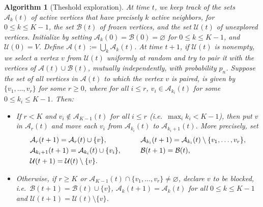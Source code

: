 \documentclass[11pt,a4paper, reqno]{article}
\newtheorem{algo}{Algorithm}
\begin{document}
\begin{algo}[{Theshold exploration}]\label{algo-th}
\normalfont At time $t$, we keep track of the sets $\mathcal{A}_k(t)$ of active vertices that have precisely $k$ active neighbors, for $0\leq k\leq K-1$, the set $\mathcal{B}(t)$ of frozen vertices, and the set $\mathcal{U}(t)$ of unexplored vertices.
Initialize by setting $\mathcal{A}_k(0)=\mathcal{B}(0)=\varnothing$ for $0\leq k\leq K-1$, and $\mathcal{U}(0)=V$. Define $\mathcal{A}(t):=\bigcup_{k}\mathcal{A}_k(t)$.
At time $t+1$, if $\mathcal{U}(t)$ is nonempty, we select a vertex $v$ from $\mathcal{U}(t)$ uniformly at random and try to pair it with the vertices of $\mathcal{A}(t)\cup\mathcal{B}(t)$, mutually independently, with probability $p_n$.
Suppose the set of all vertices in $\mathcal{A}(t)$ to which the vertex $v$ is paired, is given by $\{v_1,\dots,v_r\}$ for some $r\geq 0$, where for all $i\leq r$, $v_i\in \mathcal{A}_{k_i}(t)$ for some $0\leq k_i\leq K-1$. Then:
\begin{itemize}
\item If $r<K$ and $v_i\notin \mathcal{A}_{K-1}(t)$ for all $i\leq r$ (i.e.~$\max_i k_i<K-1$), then put $v$ in $\mathcal{A}_r(t)$ and move each $v_i$ from $\mathcal{A}_{k_i}(t)$ to $\mathcal{A}_{k_i+1}(t)$.
More precisely, set
\begin{equation*}
\begin{aligned}[t]
& \mathcal{A}_r(t+1)=\mathcal{A}_r(t)\cup \{v\},\\
& \mathcal{A}_{k_i+1}(t+1)= \mathcal{A}_{k_i}(t)\cup \{v_i\},\\
& \mathcal{U}(t+1)=\mathcal{U}(t)\setminus \{v\}.
  \end{aligned}
  \hspace*{1cm}
  \begin{aligned}[t]
&  \mathcal{A}_{k_i}(t+1)=\mathcal{A}_{k_i}(t)\setminus \{v_1,\dots,v_r\},\\
&  \mathcal{B}(t+1)=\mathcal{B}(t),\\
  \end{aligned}
\end{equation*}

\item Otherwise, if $r\geq K$ or $\mathcal{A}_{K-1}(t)\cap \{v_1,\dots,v_r\} \neq \varnothing$, declare $v$ to be blocked, i.e.~$\mathcal{B}(t+1)= \mathcal{B}(t)\cup \{v\}$, $\mathcal{A}_{k}(t+1)= \mathcal{A}_{k}(t)$ for all $0\leq k\leq K-1$ and $\mathcal{U}(t+1)=\mathcal{U}(t)\setminus \{v\}$.
\end{itemize}
\end{algo}
\end{document}
